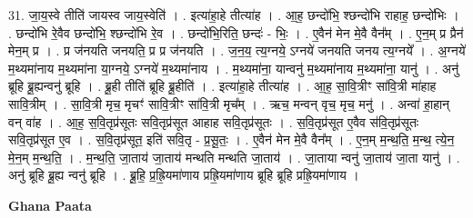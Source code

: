 \documentclass[17pt]{extarticle}
\begin{document}
31. जा॒य॒स्वे तीति॑ जायस्व जाय॒स्वेति॑ । . इत्या॑हा॒हे तीत्या॑ह । . आ॒ह॒ छन्दो॑भि॒ श्छन्दो॑भि राहाह॒ छन्दो॑भिः । . छन्दो॑भि रे॒वैव छन्दो॑भि॒ श्छन्दो॑भि रे॒व । . छन्दो॑भि॒रिति॒ छन्दः॑ - भिः॒ । . ए॒वैन॑ मेन मे॒वै वैन᳚म् । . ए॒न॒म् प्र प्रैन॑ मेन॒म् प्र । . प्र ज॑नयति जनयति॒ प्र प्र ज॑नयति । . ज॒न॒य॒ त्य॒ग्नये॒ ऽग्नये॑ जनयति जनय त्य॒ग्नये᳚ । . अ॒ग्नये॑ म॒थ्यमा॑नाय म॒थ्यमा॑ना या॒ग्नये॒ ऽग्नये॑ म॒थ्यमा॑नाय । . म॒थ्यमा॑ना॒ यान्वनु॑ म॒थ्यमा॑नाय म॒थ्यमा॑ना॒ यानु॑ । . अनु॑ ब्रूहि ब्रू॒ह्यन्वनु॑ ब्रूहि । . ब्रू॒ही तीति॑ ब्रूहि ब्रू॒हीति॑ । . इत्या॑हा॒हे तीत्या॑ह । . आ॒ह॒ सा॒वि॒त्रीꣳ सा॑वि॒त्री मा॑हाह सावि॒त्रीम् । . सा॒वि॒त्री मृच॒ मृचꣳ॑ सावि॒त्रीꣳ सा॑वि॒त्री मृच᳚म् । . ऋच॒ मन्वन् वृच॒ मृच॒ मनु॑ । . अन्वा॑ हा॒हान् वन् वा॑ह । . आ॒ह॒ स॒वि॒तृप्र॑सूतः सवि॒तृप्र॑सूत आहाह सवि॒तृप्र॑सूतः । . स॒वि॒तृप्र॑सूत ए॒वैव स॑वि॒तृप्र॑सूतः सवि॒तृप्र॑सूत ए॒व । . स॒वि॒तृप्र॑सूत॒ इति॑ सवि॒तृ - प्र॒सू॒तः॒ । . ए॒वैन॑ मेन मे॒वै वैन᳚म् । . ए॒न॒म् म॒न्थ॒ति॒ म॒न्थ॒ त्ये॒न॒ मे॒न॒म् म॒न्थ॒ति॒ । . म॒न्थ॒ति॒ जा॒ताय॑ जा॒ताय॑ मन्थति मन्थति जा॒ताय॑ । . जा॒ताया न्वनु॑ जा॒ताय॑ जा॒ता यानु॑ । . अनु॑ ब्रूहि ब्रू॒ह्य न्वनु॑ ब्रूहि । . ब्रू॒हि॒ प्र॒ह्रि॒यमा॑णाय प्रह्रि॒यमा॑णाय ब्रूहि ब्रूहि प्रह्रि॒यमा॑णाय । \newline

\textbf{Ghana Paata } \newline
\end{document}
